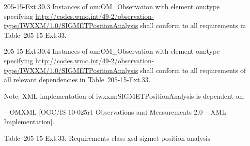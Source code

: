205-15-Ext.30.3 Instances of om:OM\_Observation with element om:type specifying \url{http://codes.wmo.int/49-2/observation-type/IWXXM/1.0/SIGMETPositionAnalysis} shall conform to all requirements in Table~205-15-Ext.33.

205-15-Ext.30.4 Instances of om:OM\_Observation with element om:type specifying \url{http://codes.wmo.int/49-2/observation-type/IWXXM/1.0/SIGMETPositionAnalysis} shall conform to all requirements of all relevant dependencies in Table~205-15-Ext.33.

Note: XML implementation of iwxxm:SIGMETPositionAnalysis is dependent on:

-- OMXML {[}OGC/IS 10-025r1 Observations and Measurements 2.0 -- XML Implementation{]}.

Table~205-15-Ext.33. Requirements class xsd-sigmet-position-analysis

